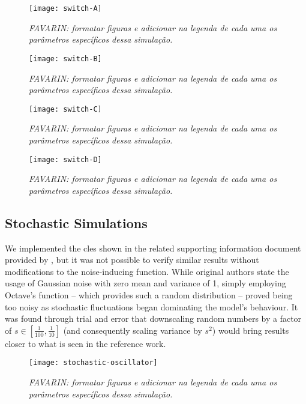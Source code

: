     \begin{figure}[!htbp]
      \centering
      \texttt{[image: switch-A]}
      \caption{\textit{FAVARIN: formatar figuras e adicionar na legenda de cada uma os parâmetros específicos dessa simulação.}}
      \label{fig.switch-A}
    \end{figure}

    \begin{figure}[!htbp]
      \centering
      \texttt{[image: switch-B]}
      \caption{\textit{FAVARIN: formatar figuras e adicionar na legenda de cada uma os parâmetros específicos dessa simulação.}}
      \label{fig.switch-B}
    \end{figure}

    \begin{figure}[!htbp]
      \centering
      \texttt{[image: switch-C]}
      \caption{\textit{FAVARIN: formatar figuras e adicionar na legenda de cada uma os parâmetros específicos dessa simulação.}}
      \label{fig.switch-C}
    \end{figure}

    \begin{figure}[!htbp]
      \centering
      \texttt{[image: switch-D]}
      \caption{\textit{FAVARIN: formatar figuras e adicionar na legenda de cada uma os parâmetros específicos dessa simulação.}}
      \label{fig.switch-D}
    \end{figure}


  \subsection{Stochastic Simulations}

    We implemented the \ac{cles} shown in the related supporting information document provided by \citet{originals}, but it was not possible to verify similar results without modifications to the noise-inducing function.
    While original authors state the usage of Gaussian noise with zero mean and variance of 1, simply employing Octave's  function -- which provides such a random distribution \cite{randn} -- proved being too noisy as stochastic fluctuations began dominating the model's behaviour.
    It was found through trial and error that downscaling random numbers by a factor of $s \in [\frac{1}{100}, \frac{1}{10}]$ (and consequently scaling variance by $s^2$) would bring results closer to what is seen in the reference work.

    \begin{figure}[!htbp]
      \centering
      \texttt{[image: stochastic-oscillator]}
      \caption{\textit{FAVARIN: formatar figuras e adicionar na legenda de cada uma os parâmetros específicos dessa simulação.}}
      \label{fig.stochastic-oscillator}
    \end{figure}

